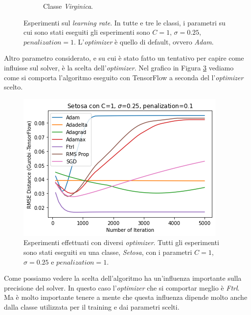 \documentclass[a4paper,12pt]{report}
\begin{document}
\begin{figure}[H]
\begin{subfigure}{\textwidth}
        \caption{Classe \textit{Virginica}.}
        \label{subfig:Virginica_learning_rate}
    \end{subfigure}
    \caption{Esperimenti sul \textit{learning rate}. In tutte e tre le classi, i parametri su cui sono stati eseguiti gli esperimenti sono $C=1$, $\sigma=0.25$, $\textit{penalization}=1$. L'\textit{optimizer} è quello di default, ovvero \textit{Adam}.}
    \label{fig:esperimenti_learning_rate}
\end{figure}


\noindent Altro parametro considerato, e su cui è stato fatto un tentativo per capire come influisse sul solver, è la scelta dell'\textit{optimizer}. Nel grafico in Figura \ref{fig:different_optimizer} vediamo come si comporta l'algoritmo eseguito con TensorFlow a seconda del l'\textit{optimizer} scelto.

\begin{figure}[H]
    \centering
    \includegraphics[scale=0.8]{images/Grafici/Different_Optimizer.png}
    \caption{Esperimenti effettuati con diversi \textit{optimizer}. Tutti gli esperimenti sono stati eseguiti su una classe, \textit{Setosa}, con i parametri $C=1$, $\sigma=0.25$ e $\textit{penalization}=1$.}
    \label{fig:different_optimizer}
\end{figure}


\noindent Come possiamo vedere la scelta dell'algoritmo ha un'influenza importante sulla precisione del solver. In questo caso l'\textit{optimizer} che si comportar meglio è \textit{Ftrl}. Ma è molto importante tenere a mente che questa influenza dipende molto anche dalla classe utilizzata per il training e dai parametri scelti.
\end{document}
